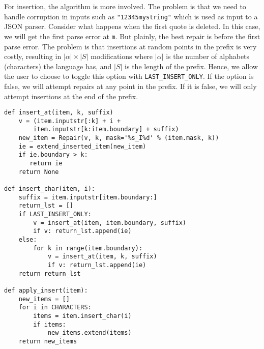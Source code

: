 \documentclass[sigconf,review,anonymous]{acmart}
\def\<#1>{\texttt{#1}}
\newcommand{\brepair}{\textsc{FSynth}\xspace}
\begin{document}
For insertion, the algorithm is more involved. The problem is that we need to
handle corruption in inputs such as \<"12345mystring"> which is used as input
to a JSON parser. Consider what happens when the first quote is deleted. In this
case, we will get the first parse error at \<m>. But plainly, the best repair
is before the first parse error. The problem is that insertions at random
points in the prefix is very costly, resulting in $|\alpha| \times |S|$
modifications where $|\alpha|$ is the number of alphabets (characters) the
language has, and $|S|$ is the length of the prefix.
Hence, we allow the user to choose to toggle this option with
\<LAST\_INSERT\_ONLY>. If the option is false, we will attempt repairs at any
point in the prefix. If it is false, we will only attempt insertions at the end
of the prefix.
\begin{lstlisting}[caption=\brepair repairs,label={lst:repairs}]
def insert_at(item, k, suffix)
    v = (item.inputstr[:k] + i +
        item.inputstr[k:item.boundary] + suffix)
    new_item = Repair(v, k, mask='%s_I%d' % (item.mask, k))
    ie = extend_inserted_item(new_item)
    if ie.boundary > k:
       return ie
    return None

def insert_char(item, i):
    suffix = item.inputstr[item.boundary:]
    return_lst = []
    if LAST_INSERT_ONLY:
        v = insert_at(item, item.boundary, suffix)
        if v: return_lst.append(ie)
    else:
        for k in range(item.boundary):
            v = insert_at(item, k, suffix)
            if v: return_lst.append(ie)
    return return_lst

def apply_insert(item):
    new_items = []
    for i in CHARACTERS:
        items = item.insert_char(i)
        if items:
            new_items.extend(items)
    return new_items
\end{lstlisting}
\end{document}
